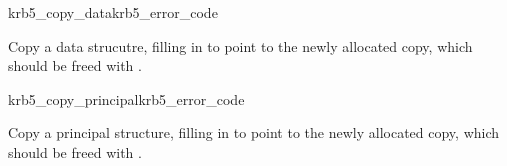 \begin{funcdecl}{krb5_copy_data}{krb5_error_code}{\funcin}
\funcout
{}
\end{funcdecl}

Copy a data strucutre, filling in  to point to the
newly allocated copy, which should be freed with .

\begin{funcdecl}{krb5_copy_principal}{krb5_error_code}{\funcin}
\funcout
{}
\end{funcdecl}
Copy a principal structure, filling in  to point to
the newly allocated copy, which should be freed with
.

